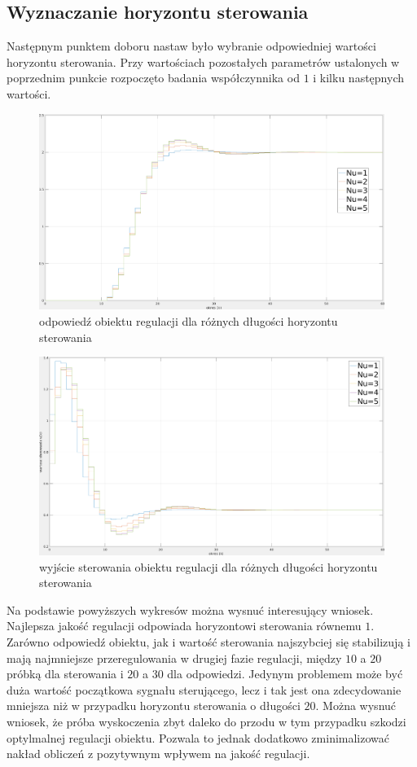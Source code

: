 \documentclass[fleqn]{article}
\begin{document}
\subsection{Wyznaczanie horyzontu sterowania}


Następnym punktem doboru nastaw było wybranie odpowiedniej wartości horyzontu sterowania. Przy wartościach pozostałych parametrów ustalonych w poprzednim punkcie rozpoczęto badania współczynnika od $1$ i kilku następnych wartości.

\begin{figure}[H]
	\includegraphics[width=\textwidth]{scripts/zadanie5cwyjscie.png}
	\caption{odpowiedź obiektu regulacji dla różnych długości horyzontu sterowania}
\end{figure}
\begin{figure}[H]
	\includegraphics[width=\textwidth]{scripts/zadanie5cster.png}
	\caption{wyjście sterowania obiektu regulacji dla różnych długości horyzontu sterowania}
\end{figure}

Na podstawie powyższych wykresów można wysnuć interesujący wniosek. Najlepsza jakość regulacji odpowiada horyzontowi sterowania równemu $1$. Zarówno odpowiedź obiektu, jak i wartość sterowania najszybciej się stabilizują i mają najmniejsze przeregulowania w drugiej fazie regulacji, między $10$ a $20$ próbką dla sterowania i $20$ a $30$ dla odpowiedzi. Jedynym problemem może być duża wartość początkowa sygnału sterującego, lecz i tak jest ona zdecydowanie mniejsza niż w przypadku horyzontu sterowania o długości $20$. Można wysnuć wniosek, że próba wyskoczenia zbyt daleko do przodu w tym przypadku szkodzi optylmalnej regulacji obiektu. Pozwala to jednak dodatkowo zminimalizować nakład obliczeń z pozytywnym wpływem na jakość regulacji.
\end{document}
